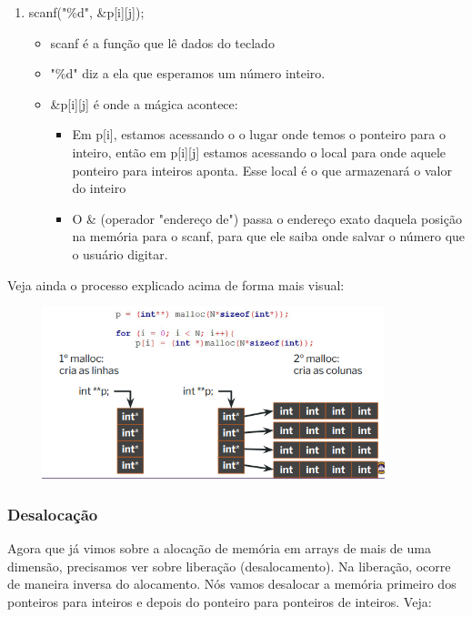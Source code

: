 \documentclass{report}
\begin{document}
\begin{enumerate}
\begin{itemize}
		\end{itemize}
		\item scanf("\%d", \&p[i][j]);
		\begin{itemize}
			\item scanf é a função que lê dados do teclado
			\item "\%d" diz a ela que esperamos um número inteiro.
			\item \&p[i][j] é onde a mágica acontece:
			\begin{itemize}
				\item Em p[i], estamos acessando o o lugar onde temos o ponteiro para o inteiro, então em p[i][j] estamos acessando o local para onde aquele ponteiro para inteiros aponta. Esse local é o que armazenará o valor do inteiro
				\item O \& (operador "endereço de") passa o endereço exato daquela posição na memória para o scanf, para que ele saiba onde salvar o número que o usuário digitar.
			\end{itemize}
		\end{itemize}
	\end{enumerate}
	
	Veja ainda o processo explicado acima de forma mais visual:
	
		
	\begin{center}
		
		\includegraphics[width=12cm,height=5cm,keepaspectratio=false]{imagens/pointpoint2.png}
		
	\end{center}
	
	\subsubsection{Desalocação}
	
	Agora que já vimos sobre a alocação de memória em arrays de mais de uma dimensão, precisamos ver sobre liberação (desalocamento). Na liberação, ocorre de maneira inversa do alocamento. Nós vamos desalocar a memória primeiro dos ponteiros para inteiros e depois do ponteiro para ponteiros de inteiros. Veja:
	
\end{document}
